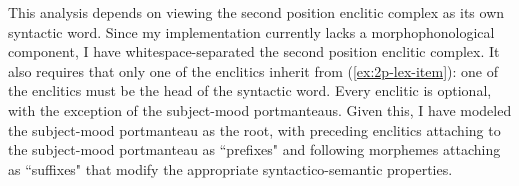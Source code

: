 \begin{comment}
My analysis for this is the same as that for focus fronting, minus the addition of focused information. I create a similar rule that behaves in the same way, \textit{non-focus-filler-head-rule}. Where the \textit{focus-filler-head-rule} adds focus information to its non-head-daughter, the \textit{non-focus-filler-head-rule} does not, and requires that its non-head-daughter be [\textsc{head} \textit{quantifier}]. Similarly, I add the constraint to \textit{focus-filler-head-rule} that its non-head-daughter be [\textsc{head} \textit{non-quantifier}].

I assert that the clitics are the syntactic heads of the clause. This analysis requires argument composition, or a word (in this case, the syntactic word of the second position enclitic complex) taking on the arguments of its complement (here, the sentential predicate), an analysis first developed in \cite{millersag1997}. The way I model this in my implementation is by the subject-mood clitics taking their complement's valence properties and making it their own. That is, the generic type for the second-position clitics is:

\ex \label{ex:2pavm}
\begin{avm}
\[\asort{clausal-inflection}
  \textsc{head.pred} & + \\
  \textsc{subj} & \avmbox{1} \\
  \textsc{comp} & \< \[\textsc{head.pred} & $+$ \\
                       \textsc{subj} & \avmbox{1} \\
                       \textsc{comp} & \avmbox{2} \] \>\ $\oplus$ \avmbox{2}
 \]
\end{avm}
\xe

\end{comment}


This analysis depends on viewing the second position enclitic complex as its own syntactic word. Since my implementation currently lacks a morphophonological component, I have whitespace-separated the second position enclitic complex. It also requires that only one of the enclitics inherit from (\ref{ex:2p-lex-item}): one of the enclitics must be the head of the syntactic word. Every enclitic is optional, with the exception of the subject-mood portmanteaus. Given this, I have modeled the subject-mood portmanteau as the root, with preceding enclitics attaching to the subject-mood portmanteau as ``prefixes" and following morphemes attaching as ``suffixes" that modify the appropriate syntactico-semantic properties.

